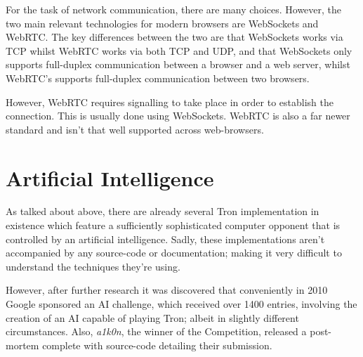 \documentclass[class=article, crop=false]{standalone}
\begin{document}
		For the task of network communication, there are many choices. However, the two main relevant technologies for modern browsers are WebSockets and WebRTC. The key differences between the two are that WebSockets works via TCP whilst WebRTC works via both TCP and UDP, and that WebSockets only supports full-duplex communication between a browser and a web server, whilst WebRTC's supports full-duplex communication between two browsers. 

		However, WebRTC requires signalling to take place in order to establish the connection. This is usually done using WebSockets. WebRTC is also a far newer standard and isn't that well supported across web-browsers.

	\section{Artificial Intelligence}
		As talked about above, there are already several Tron implementation in existence which feature a sufficiently sophisticated computer opponent that is controlled by an artificial intelligence. Sadly, these implementations aren't accompanied by any source-code or documentation; making it very difficult to understand the techniques they're using.

		However, after further research it was discovered that conveniently in 2010 Google sponsored an AI challenge\parencite{GoogleTronAi}, which received over 1400 entries, involving the creation of an AI capable of playing Tron; albeit in slightly different circumstances. Also, \emph{a1k0n}, the winner of the Competition, released a post-mortem\parencite{TronPostMortem} complete with source-code detailing their submission. \label{sec:background-google-ai}
\end{document}

